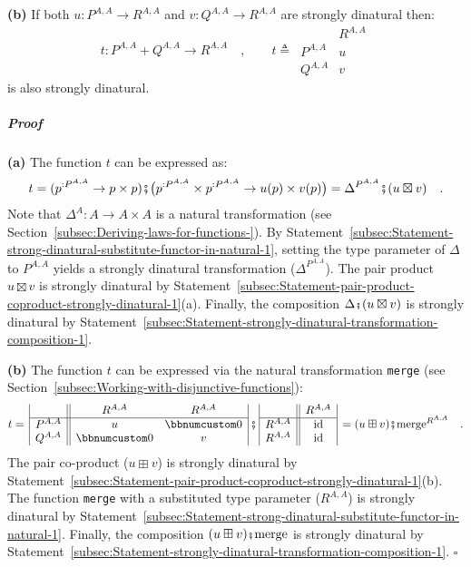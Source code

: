 \textbf{(b)} If both $u:P^{A,A}\rightarrow R^{A,A}$ and $v:Q^{A,A}\rightarrow R^{A,A}$
are strongly dinatural then:
\[
t:P^{A,A}+Q^{A,A}\rightarrow R^{A,A}\quad,\quad\quad t\triangleq\,\begin{array}{|c||c|}
 & R^{A,A}\\
\hline P^{A,A} & u\\
Q^{A,A} & v
\end{array}
\]
is also strongly dinatural.

\subparagraph{Proof}

\textbf{(a)} The function $t$ can be expressed as:
\[
t=(p^{:P^{A,A}}\rightarrow p\times p)\bef\big(p^{:P^{A,A}}\times p^{:P^{A,A}}\rightarrow u(p)\times v(p)\big)=\Delta^{P^{A,A}}\bef(u\boxtimes v)\quad.
\]
Note that $\Delta^{A}:A\rightarrow A\times A$ is a natural transformation
(see Section~\ref{subsec:Deriving-laws-for-functions-}). By Statement~\ref{subsec:Statement-strong-dinatural-substitute-functor-in-natural-1},
setting the type parameter of $\Delta$ to $P^{A,A}$ yields a strongly
dinatural transformation ($\Delta^{P^{A,A}}$). The pair product $u\boxtimes v$
is strongly dinatural by Statement~\ref{subsec:Statement-pair-product-coproduct-strongly-dinatural-1}(a).
Finally, the composition $\Delta\bef(u\boxtimes v)$ is strongly dinatural
by Statement~\ref{subsec:Statement-strongly-dinatural-transformation-composition-1}.

\textbf{(b)} The function $t$ can be expressed via the natural transformation
\lstinline!merge! (see Section~\ref{subsec:Working-with-disjunctive-functions}):
\[
t=\,\begin{array}{|c||cc|}
 & R^{A,A} & R^{A,A}\\
\hline P^{A,A} & u & \bbnum 0\\
Q^{A,A} & \bbnum 0 & v
\end{array}\,\bef\,\begin{array}{|c||c|}
 & R^{A,A}\\
\hline R^{A,A} & \text{id}\\
R^{A,A} & \text{id}
\end{array}\,=(u\boxplus v)\bef\text{merge}^{R^{A,A}}\quad.
\]
The pair co-product ($u\boxplus v$) is strongly dinatural by Statement~\ref{subsec:Statement-pair-product-coproduct-strongly-dinatural-1}(b).
The function \lstinline!merge! with a substituted type parameter
($R^{A,A}$) is strongly dinatural by Statement~\ref{subsec:Statement-strong-dinatural-substitute-functor-in-natural-1}.
Finally, the composition $(u\boxplus v)\bef\text{merge}$ is strongly
dinatural by Statement~\ref{subsec:Statement-strongly-dinatural-transformation-composition-1}.
$\square$

